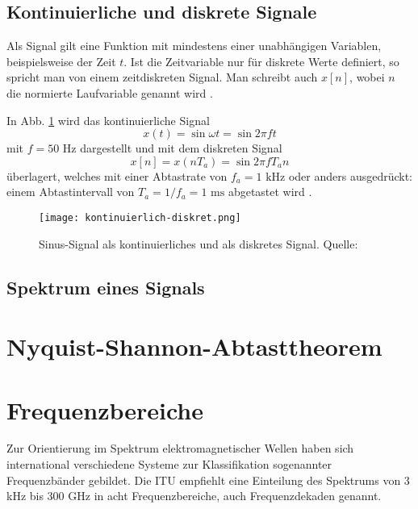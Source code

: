 \subsection{Kontinuierliche und diskrete Signale}
Als Signal gilt eine Funktion mit mindestens einer unabhängigen Variablen, beispielsweise der Zeit \(t\). Ist die Zeitvariable nur für diskrete Werte definiert, so spricht man von einem zeitdiskreten Signal. Man schreibt auch \(x[n]\), wobei \(n\) die normierte Laufvariable genannt wird \cite[vgl. Werner, S. 24]{Werner:2017}.

In Abb. \ref{kontinuierlich_diskret} wird das kontinuierliche Signal
\[x(t) = \sin \omega t = \sin 2\pi f t\]
mit \(f = 50 \text{ Hz} \) dargestellt und mit dem diskreten Signal
\[x[n] = x(nT_a) = \sin 2\pi f T_a n\]
überlagert, welches mit einer Abtastrate von \(f_a = 1 \text{ kHz}\) oder anders ausgedrückt: einem Abtastintervall von \(T_a = 1 / f_a = 1 \text{ ms}\) abgetastet wird \cite[vgl. Heuberger, e. a., S. 11f]{Heuberger:2017}.

\begin{figure}[ht]
	\centering
	\texttt{[image: kontinuierlich-diskret.png]}
	\caption[Sinus-Signal als kontinuierliches und als diskretes Signal]{Sinus-Signal als kontinuierliches und als diskretes Signal. \newline Quelle: \cite[Heuberger, e. a., S. 12]{Heuberger:2017}} 
	\label{kontinuierlich_diskret}
\end{figure}

\subsection{Spektrum eines Signals}


\section{Nyquist-Shannon-Abtasttheorem}

\newpage
\section{Frequenzbereiche}
Zur Orientierung im Spektrum elektromagnetischer Wellen haben sich international verschiedene Systeme zur Klassifikation sogenannter Frequenzbänder gebildet. Die \ac{ITU} empfiehlt eine Einteilung des Spektrums von 3 kHz bis 300 GHz in acht Frequenzbereiche, auch Frequenzdekaden genannt. \cite[vgl. ITU-R v.431-8]{itu-431:2015}

